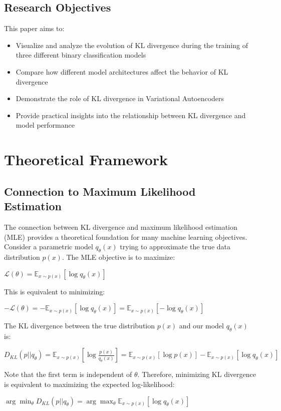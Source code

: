 \documentclass[preprint,12pt]{elsarticle}
\begin{document}
\subsection{Research Objectives}
This paper aims to:
\begin{itemize}
    \item Visualize and analyze the evolution of KL divergence during the training of three different binary classification models
    \item Compare how different model architectures affect the behavior of KL divergence
    \item Demonstrate the role of KL divergence in Variational Autoencoders
    \item Provide practical insights into the relationship between KL divergence and model performance
\end{itemize}

\section{Theoretical Framework}
\subsection{Connection to Maximum Likelihood Estimation}
The connection between KL divergence and maximum likelihood estimation (MLE) provides a theoretical foundation for many machine learning objectives. Consider a parametric model $q_\theta(x)$ trying to approximate the true data distribution $p(x)$. The MLE objective is to maximize:

$
\mathcal{L}(\theta) = \mathbb{E}_{x \sim p(x)}[\log q_\theta(x)]
$

This is equivalent to minimizing:

$
-\mathcal{L}(\theta) = -\mathbb{E}_{x \sim p(x)}[\log q_\theta(x)]
= \mathbb{E}_{x \sim p(x)}[-\log q_\theta(x)]
$

The KL divergence between the true distribution $p(x)$ and our model $q_\theta(x)$ is:

$
D_{KL}(p||q_\theta) = \mathbb{E}_{x \sim p(x)}\left[\log \frac{p(x)}{q_\theta(x)}\right]
= \mathbb{E}_{x \sim p(x)}[\log p(x)] - \mathbb{E}_{x \sim p(x)}[\log q_\theta(x)]
$

Note that the first term is independent of $\theta$. Therefore, minimizing KL divergence is equivalent to maximizing the expected log-likelihood:

$
\arg\min_\theta D_{KL}(p||q_\theta) = \arg\max_\theta \mathbb{E}_{x \sim p(x)}[\log q_\theta(x)]
$
\end{document}
